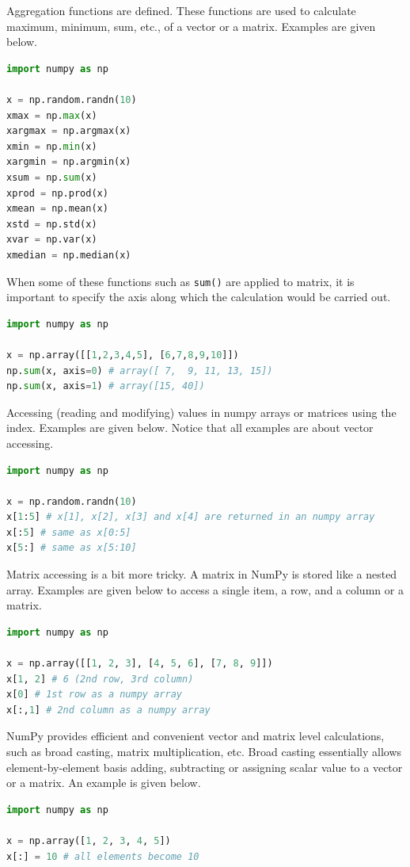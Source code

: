 Aggregation functions are defined. These functions are used to calculate maximum, minimum, sum, etc., of a vector or a matrix. Examples are given below.
\begin{lstlisting}[language=Python]
import numpy as np

x = np.random.randn(10)
xmax = np.max(x)
xargmax = np.argmax(x)
xmin = np.min(x)
xargmin = np.argmin(x)
xsum = np.sum(x)
xprod = np.prod(x)
xmean = np.mean(x)
xstd = np.std(x)
xvar = np.var(x)
xmedian = np.median(x)
\end{lstlisting}
When some of these functions such as \verb|sum()| are applied to matrix, it is important to specify the axis along which the calculation would be carried out.
\begin{lstlisting}[language=Python]
import numpy as np

x = np.array([[1,2,3,4,5], [6,7,8,9,10]])
np.sum(x, axis=0) # array([ 7,  9, 11, 13, 15])
np.sum(x, axis=1) # array([15, 40])
\end{lstlisting}

Accessing (reading and modifying) values in numpy arrays or matrices using the index. Examples are given below. Notice that all examples are about vector accessing. 
\begin{lstlisting}[language=Python]
import numpy as np

x = np.random.randn(10)
x[1:5] # x[1], x[2], x[3] and x[4] are returned in an numpy array
x[:5] # same as x[0:5]
x[5:] # same as x[5:10]
\end{lstlisting}
Matrix accessing is a bit more tricky. A matrix in NumPy is stored like a nested array. Examples are given below to access a single item, a row, and a column or a matrix.
\begin{lstlisting}[language=Python]
import numpy as np

x = np.array([[1, 2, 3], [4, 5, 6], [7, 8, 9]])
x[1, 2] # 6 (2nd row, 3rd column)
x[0] # 1st row as a numpy array
x[:,1] # 2nd column as a numpy array
\end{lstlisting}

NumPy provides efficient and convenient vector and matrix level calculations, such as broad casting, matrix multiplication, etc. Broad casting essentially allows element-by-element basis adding, subtracting or assigning scalar value to a vector or a matrix. An example is given below.
\begin{lstlisting}[language=Python]
import numpy as np

x = np.array([1, 2, 3, 4, 5])
x[:] = 10 # all elements become 10
\end{lstlisting}

